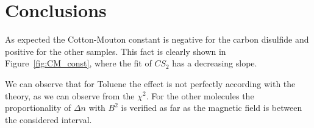 \documentclass[11pt,a4paper]{article}
\begin{document}
\section{Conclusions}
As expected the Cotton-Mouton constant is negative for the carbon disulfide and positive for the other samples. This fact is clearly shown in Figure~\ref{fig:CM_const}, where the fit of $CS_2$ has a decreasing slope. 

We can observe that for Toluene the effect is not perfectly according with the theory, as we can observe from the $\chi^2$. For the other molecules the proportionality of $\Delta n$ with $B^2$ is verified as far as the magnetic field is between the considered interval.

{\color{white}\cite{wilson1997simple}\cite{note19923}\cite{montarou2004two}\cite{freiser1968survey}}
\newpage


\end{document}
